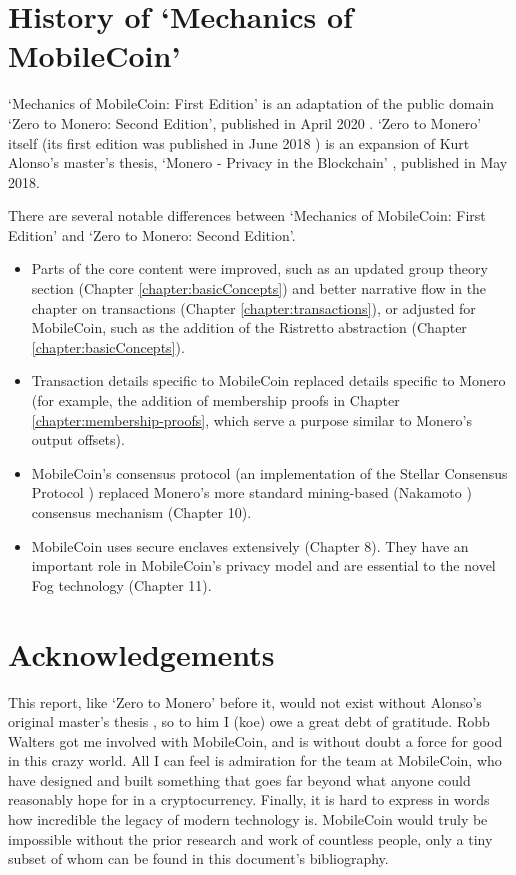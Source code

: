 \section{History of `Mechanics of MobileCoin'}

`Mechanics of MobileCoin: First Edition' is an adaptation of the public domain `Zero to Monero: Second Edition', published in April 2020 \cite{ztm-2}. `Zero to Monero' itself (its first edition was published in June 2018 \cite{ztm-1}) is an expansion of Kurt Alonso's master's thesis, `Monero - Privacy in the Blockchain' \cite{kurt-original}, published in May 2018.

There are several notable differences between `Mechanics of MobileCoin: First Edition' and `Zero to Monero: Second Edition'.

\begin{itemize}
    \item Parts of the core content were improved, such as an updated group theory section (Chapter \ref{chapter:basicConcepts}) and better narrative flow in the chapter on transactions (Chapter \ref{chapter:transactions}), or adjusted for MobileCoin, such as the addition of the Ristretto abstraction (Chapter \ref{chapter:basicConcepts}).
    \item Transaction details specific to MobileCoin replaced details specific to Monero (for example, the addition of membership proofs in Chapter \ref{chapter:membership-proofs}, which serve a purpose similar to Monero's output offsets).
    \item MobileCoin's consensus protocol (an implementation of the Stellar Consensus Protocol \cite{stellar-consensus-protocol}) replaced Monero's more standard mining-based (Nakamoto \cite{Nakamoto_bitcoin}) consensus mechanism (Chapter 10).
    \item MobileCoin uses secure enclaves extensively (Chapter 8). They have an important role in MobileCoin's privacy model and are essential to the novel Fog technology (Chapter 11).%
\end{itemize}



\section{Acknowledgements}
\label{sec:acknowledgements}


This report, like `Zero to Monero' before it, would not exist without Alonso's original master's thesis \cite{kurt-original}, so to him I (koe) owe a great debt of gratitude. Robb Walters got me involved with MobileCoin, and is without doubt a force for good in this crazy world. All I can feel is admiration for the team at MobileCoin, who have designed and built something that goes far beyond what anyone could reasonably hope for in a cryptocurrency. Finally, it is hard to express in words how incredible the legacy of modern technology is. MobileCoin would truly be impossible without the prior research and work of countless people, only a tiny subset of whom can be found in this document's bibliography.